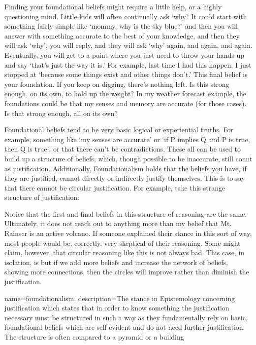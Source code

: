 Finding your foundational beliefs might require a little help, or a highly questioning mind. Little kids will often continually ask `why'. It could start with something fairly simple like `mommy, why is the sky blue?' and then you will answer with something accurate to the best of your knowledge, and then they will ask `why', you will reply, and they will ask `why' again, and again, and again. Eventually, you will get to a point where you just need to throw your hands up and say `that's just the way it is.' For example, last time I had this happen, I just stopped at `because some things exist and other things don't.' This final belief is your foundation. If you keep on digging, there's nothing left. Is this strong enough, on its own, to hold up the weight? In my weather forecast example, the foundations could be that my senses and memory are accurate (for those cases). Is that strong enough, all on its own? 

Foundational beliefs tend to be very basic logical or experiential truths. For example, something like `my senses are accurate' or `if P implies Q and P is true, then Q is true', or that there can't be contradictions. These all can be used to build up a structure of beliefs, which, though possible to be inaccurate, still count as justification. Additionally, Foundationalism holds that the beliefs you have, if they are justified, cannot directly or indirectly justify themselves. This is to say that there cannot be circular justification. For example, take this strange structure of justification:


Notice that the first and final beliefs in this structure of reasoning are the same. Ultimately, it does not reach out to anything more than my belief that Mt. Rainser is an active volcano. If someone explained their stance in this sort of way, most people would be, correctly, very skeptical of their reasoning. Some might claim, however, that circular reasoning like this is not always bad. This case, in isolation, is but if we add more beliefs and increase the network of beliefs, showing more connections, then the circles will improve rather than diminish the justification. 

{
name=foundationalism,
description={The stance in Epistemology concerning justification which states that in order to know something the justification necessary must be structured in such a way as they fundamentally rely on basic, foundational beliefs which are self-evident and do not need further justification. The structure is often compared to a pyramid or a building}
}


